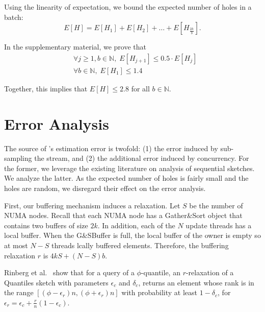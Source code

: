 Using the linearity of expectation, we bound the expected number of holes in a batch:
\[E\left[H\right]= E\left[H_1\right] + E\left[H_2\right] + \dots + E\left[H_{\frac{2k}{b}}\right]. \]

In the supplementary material, we prove that
\begin{align*}
& \forall j\geq1, b\in \mathds{N}, \; E[H_{j+1}] \leq 0.5 \cdot E[H_j] \\ 
& \forall b \in \mathds{N}, \;  E[H_1] \leq 1.4 
\end{align*}

Together, this implies that  $E[H] \leq 2.8$ for all $b \in \mathds{N}$.

\section{Error Analysis}
\label{sec:error-analysis}

The source of \mysketch's estimation error is twofold: (1) the error induced by sub-sampling the stream, and (2) the additional error induced by concurrency. For the former, we leverage the existing literature on analysis of sequential sketches. We analyze the latter. 
As the expected number of holes is fairly small and the holes are random, we disregard their effect on the error analysis. 

First, our buffering mechanism induces a relaxation. Let $S$ be the number of NUMA nodes. Recall that each NUMA node has a Gather\&Sort object that contains two buffers of size $2k$. In addition, each of the $N$ update threads has a local buffer. When the G\&SBuffer is full, the local buffer of the owner is empty so at most $N-S$ threads lcally buffered elements. Therefore, the buffering relaxation $r$ is $4kS+(N-S)b$.


Rinberg et al.~\cite{Rinberg_2020_fast_sketches} show that for a query of a $\phi$-quantile, an $r$-relaxation of a Quantiles sketch with parameters $\epsilon_c$ and $\delta_c$, returns an element whose rank is in the range $[(\phi-\epsilon_r)n,(\phi+\epsilon_r)n]$ with probability at least $1-\delta_c$, for $\epsilon_r=\epsilon_c+\frac{r}{n}(1-\epsilon_c)$.


